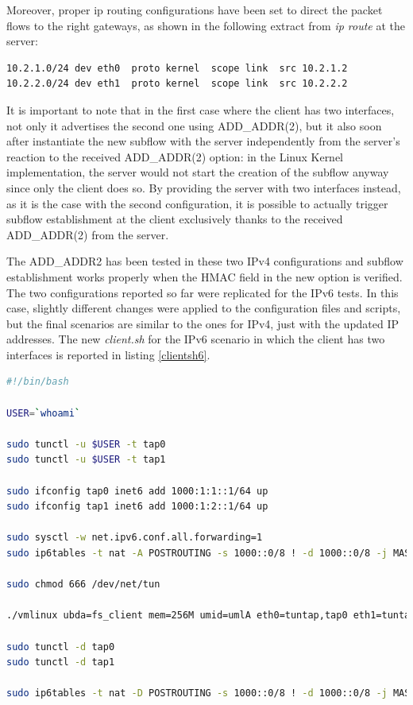 Moreover, proper ip routing configurations have been set to direct the packet flows to the right gateways, as shown in the following extract from \textit{ip route} at the server:

\begin{verbatim}
10.2.1.0/24 dev eth0  proto kernel  scope link  src 10.2.1.2
10.2.2.0/24 dev eth1  proto kernel  scope link  src 10.2.2.2
\end{verbatim}

It is important to note that in the first case where the client has two interfaces, not only it advertises the second one using ADD\_ADDR(2), but it also soon after instantiate the new subflow with the server independently from the server's reaction to the received ADD\_ADDR(2) option: in the Linux Kernel implementation, the server would not start the creation of the subflow anyway since only the client does so. By providing the server with two interfaces instead, as it is the case with the second configuration, it is possible to actually trigger subflow establishment at the client exclusively thanks to the received ADD\_ADDR(2) from the server.

The ADD\_ADDR2 has been tested in these two IPv4 configurations and subflow establishment works properly when the HMAC field in the new option is verified.
The two configurations reported so far were replicated for the IPv6 tests. In this case, slightly different changes were applied to the configuration files and scripts, but the final scenarios are similar to the ones for IPv4, just with the updated IP addresses. The new \textit{client.sh} for the IPv6 scenario in which the client has two interfaces is reported in listing \ref{clientsh6}.

\begin{lstlisting}[language=bash, caption=\textit{client.sh} for IPv6 setup, label=clientsh6]
#!/bin/bash

USER=`whoami`

sudo tunctl -u $USER -t tap0
sudo tunctl -u $USER -t tap1

sudo ifconfig tap0 inet6 add 1000:1:1::1/64 up
sudo ifconfig tap1 inet6 add 1000:1:2::1/64 up

sudo sysctl -w net.ipv6.conf.all.forwarding=1
sudo ip6tables -t nat -A POSTROUTING -s 1000::0/8 ! -d 1000::0/8 -j MASQUERADE

sudo chmod 666 /dev/net/tun

./vmlinux ubda=fs_client mem=256M umid=umlA eth0=tuntap,tap0 eth1=tuntap,tap1

sudo tunctl -d tap0
sudo tunctl -d tap1

sudo ip6tables -t nat -D POSTROUTING -s 1000::0/8 ! -d 1000::0/8 -j MASQUERADE
\end{lstlisting}

